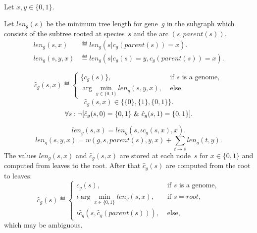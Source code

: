 \documentclass[10pt,a4paper]{article}
\theoremstyle{plain} \newtheorem{Lem}{Lemma}
\begin{document}
Let $x, y \in \{0,1\}$.

Let $len_g(s)$ be the minimum tree length for gene~$g$ in the subgraph which consists of the subtree rooted at species~$s$ and the arc $(s,parent(s))$.
\begin{equation*}
  \begin{split}
    len_g(s,x)   &\eqdef len_g(s|c_g(parent(s)) = x). \\
    len_g(s,y,x) &\eqdef len_g(s|c_g(s) = y, c_g(parent(s)) = x). 
  \end{split}
\end{equation*}

\begin{equation*}
\hat c_g(s,x) \eqdef 
  \begin{cases}
    \{c_g(s)\}, &\text{ if $s$ is a genome},\\
    \arg \min_{y \in \{0,1\}} len_g(s,y,x), &\text{ else}.
  \end{cases}   
\end{equation*}
$$ \hat c_g(s,x) \in \{\{0\}, \{1\}, \{0,1\} \}. $$
$$ \forall s: \neg [\hat c_g(s,0) = \{0,1\} \ \& \  \hat c_g(s,1) = \{0,1\}]. $$  


$$ len_g(s,x) = len_g(s, \iota \hat c_g(s,x), x). $$
$$ len_g(s,y,x) = w(g,s,parent(s),y,x) + \sum_{t \to s} len_g(t,y). $$
The values $len_g(s,x)$ and $\hat c_g(s,x)$ are stored at each node~$s$ for $x \in \{0,1\}$ and computed from leaves to the root.
After that $\hat c_g(s)$ are computed from the root to leaves:
\begin{equation*}
 \hat c_g(s) \eqdef 
  \begin{cases}
    c_g(s), &\text{ if $s$ is a genome},\\
    \iota \arg \min_{x \in \{0,1\}} len_g(s,x), &\text{ if } s = root,\\
    \iota \hat c_g(s, \hat c_g(parent(s))), &\text{ else},
  \end{cases}   
\end{equation*}
which may be ambiguous.
\end{document}
